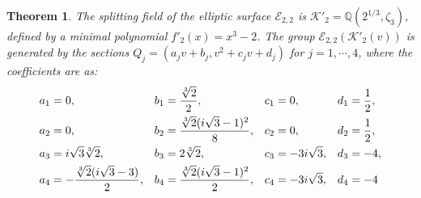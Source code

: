 \documentclass[11pt]{amsart}
\newcommand{\Q}{{\mathbb Q}}
\newcommand{\Ee}{{\mathcal E}}
\newcommand{\KK}{{\mathcal K}}
\newtheorem{thm}{Theorem}[section]
\numberwithin{equation}{section}
\numberwithin{table}{section}
\newcommand\<{\langle}
\begin{document}
	\begin{thm}
		\label{main5}
	  The splitting field of  the  elliptic surface $\Ee_{2,2}$ is  $\KK'_2 = \Q(2^{1/3}, \zeta_3)$, defined by a minimal polynomial
		$f'_2(x)= x^3 - 2$.
  The group $\Ee_{2,2}(\KK'_2(v))$ is generated by the sections $Q_j=(a_j v+ b_j, v^2+ c_j v +d_j)$ for $j=1, \cdots, 4$, where the coefficients are as:
	\begin{align}
	a_1 &= 0, & b_1 &= \frac{\sqrt[3]{2}}{2}, & c_1 &= 0, & d_1 &= \frac{1}{2}, \notag \\
	a_2 &= 0, & b_2 &= \frac{\sqrt[3]{2}(i\sqrt{3}-1)^2}{8}, & c_2 &= 0, & d_2 &= \frac{1}{2},\notag \\
	a_3 &= i\sqrt{3}\sqrt[3]{2}, & b_3 &= 2\sqrt[3]{2}, & c_3 &= -3i\sqrt{3}, & d_3 &= -4,\notag  \\
	a_4 &= -\frac{\sqrt[3]{2}(i\sqrt{3}-3)}{2}, & b_4 &= \frac{\sqrt[3]{2}(i\sqrt{3}-1)^2}{2}, & c_4 &= -3i\sqrt{3}, & d_4 &= -4
\label{Q-(2,2)}
	\end{align}
\end{thm}
 
\end{document}
